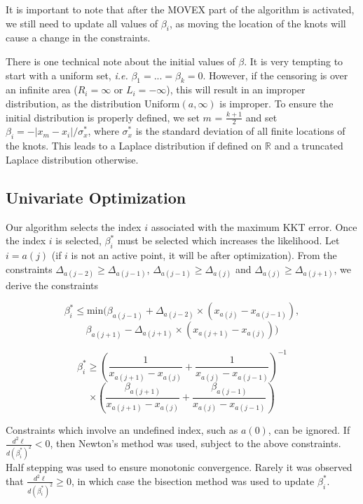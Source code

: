 	It is important to note that after the MOVEX part of the algorithm is activated, we still need to update all values of $\beta_i$, as moving the location of the knots will cause a change in the constraints. 
	
	There is one technical note about the initial values of $\beta$. It is very tempting to start with a uniform set, \emph{i.e.} $\beta_1 = ... = \beta_k = 0$. However, if the censoring is over an infinite area ($R_i = \infty$ or $L_i = -\infty$), this will result in an improper distribution, as the distribution Uniform$(a, \infty)$ is improper. To ensure the initial distribution is properly defined, we set $m$ = $\frac{k + 1} {2}$ and set $\beta_i = -|x_m - x_i | / \sigma_x^*$, where $\sigma_x^*$ is the standard deviation of all finite locations of the knots. This leads to a Laplace distribution if defined on $\mathbb{R}$ and a truncated Laplace distribution otherwise.	
	\\
	
	{\subsection{Univariate Optimization}} 
	
	Our algorithm selects the index $i$ associated with the maximum KKT error. Once the index $i$ is selected, $\beta_i^*$ must be selected which increases the likelihood. Let $i = a(j)$ (if $i$ is not an active point, it will be after optimization). From the constraints $\Delta_{a(j-2)} \geq \Delta_{a(j-1)}$, $\Delta_{a(j-1)} \geq \Delta_{a(j)}$ and $\Delta_{a(j)} \geq \Delta_{a(j+1)}$, we derive the constraints
	
	\[
	 \beta_i^* \leq \text{min} (\beta_{a(j-1)} + \Delta_{a(j-2)} \times (x_{a(j)} - x_{a(j-1)}),
	 \]
	 \[
	 \beta_{a(j+1)} -\Delta_{a(j+1)} \times (x_{a(j+1)} - x_{a(j)}) ) 
	\]
	
	\[
	 \beta_i^* \geq \left(\frac{1}{x_{a(j+1)} - x_{a(j)}} +  \frac{1}{x_{a(j)} - x_{a(j-1)} } \right)^{-1} 
	\]
	\[
	\times \left(\frac{\beta_{a(j+1)} } { x_{a(j+1)} - x_{a(j)}} + \frac{\beta_{a(j-1)}} {x_{a(j)} - x_{a(j-1)} } \right)
	\]
	
	Constraints which involve an undefined index, such as $a(0)$, can be ignored. If $\frac{d^2 \ell} {d (\beta^*_{i})^2 } < 0$, then Newton's method was used, subject to the above constraints. Half stepping was used to ensure monotonic convergence. Rarely it was observed that $\frac{d^2 \ell} {d (\beta^*_{i}) ^2 } \geq 0$, in which case the bisection method was used to update $\beta^*_i$. 
	
